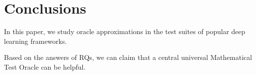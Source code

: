 \section{Conclusions}
In this paper, we study oracle approximations in the test suites of popular deep learning frameworks.

Based on the answers of RQs, we can claim that a central universal Mathematical Test Oracle can be helpful.